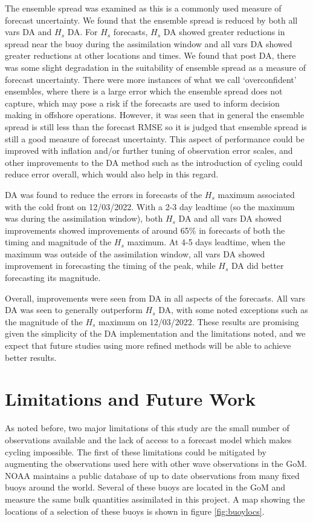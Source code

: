 The ensemble spread was examined as this is a commonly used measure of forecast uncertainty. We found that the ensemble spread is reduced by both all vars DA and $H_s$ DA. For $H_s$ forecasts, $H_s$ DA showed greater reductions in spread near the buoy during the assimilation window and all vars DA showed greater reductions at other locations and times. We found that post DA, there was some slight degradation in the suitability of ensemble spread as a measure of forecast uncertainty. There were more instances of what we call `overconfident' ensembles, where there is a large error which the ensemble spread does not capture, which may pose a risk if the forecasts are used to inform decision making in offshore operations. However, it was seen that in general the ensemble spread is still less than the forecast RMSE so it is judged that ensemble spread is still a good measure of forecast uncertainty. This aspect of performance could be improved with inflation and/or further tuning of observation error scales, and other improvements to the DA method such as the introduction of cycling could reduce error overall, which would also help in this regard.

DA was found to reduce the errors in forecasts of the $H_s$ maximum associated with the cold front on 12/03/2022. With a 2-3 day leadtime (so the maximum was during the assimilation window), both $H_s$ DA and all vars DA showed improvements showed improvements of around 65\% in forecasts of both the timing and magnitude of the $H_s$ maximum. At 4-5 days leadtime, when the maximum was outside of the assimilation window, all vars DA showed improvement in forecasting the timing of the peak, while $H_s$ DA did better forecasting its magnitude.

Overall, improvements were seen from DA in all aspects of the forecasts. All vars DA was seen to generally outperform $H_s$ DA, with some noted exceptions such as the magnitude of the $H_s$ maximum on 12/03/2022. These results are promising given the simplicity of the DA implementation and the limitations noted, and we expect that future studies using more refined methods will be able to achieve better results.

\section{Limitations and Future Work}

As noted before, two major limitations of this study are the small number of observations available and the lack of access to a forecast model which makes cycling impossible. The first of these limitations could be mitigated by augmenting the observations used here with other wave observations in the GoM. NOAA maintains a public database of up to date observations from many fixed buoys around the world. Several of these buoys are located in the GoM and measure the same bulk quantities assimilated in this project. A map showing the locations of a selection of these buoys is shown in figure \ref{fig:buoylocs}.

